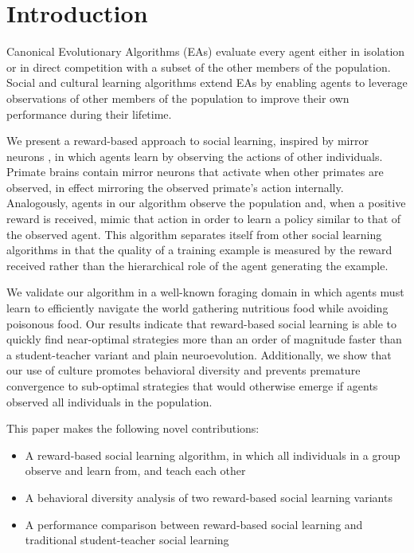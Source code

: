 \documentclass{acm_proc_article-sp}
\begin{document}
\section{Introduction}

Canonical Evolutionary Algorithms (EAs) \cite{fogel1966artificial} evaluate every agent either in isolation or in direct competition with a subset of the other members of the population. Social and cultural learning algorithms \cite{reynolds1994introduction} extend EAs by enabling agents to leverage observations of other members of the population to improve their own performance during their lifetime. 



We present a reward-based approach to social learning, inspired by mirror neurons \cite{gallese-98}, in which agents learn by observing the actions of other individuals. Primate brains contain mirror neurons that activate when other primates are observed, in effect mirroring the observed primate's action internally. Analogously, agents in our algorithm observe the population and, when a positive reward is received, mimic that action in order to learn a policy similar to that of the observed agent. This algorithm separates itself from other social learning algorithms in that the quality of a training example is measured by the reward received rather than the hierarchical role of the agent generating the example.

We validate our algorithm in a well-known foraging domain in which agents must learn to efficiently navigate the world gathering nutritious food while avoiding poisonous food. Our results indicate that reward-based social learning is able to quickly find near-optimal strategies more than an order of magnitude faster than a student-teacher variant and plain neuroevolution. Additionally, we show that our use of culture promotes behavioral diversity and prevents premature convergence to sub-optimal strategies that would otherwise emerge if agents observed all individuals in the population.

This paper makes the following novel contributions:
 
\begin{itemize}
\item A reward-based social learning algorithm, in which all individuals in a group observe and learn from, and teach each other
\item A behavioral diversity analysis of two reward-based social learning variants
\item A performance comparison between reward-based social learning and traditional student-teacher social learning
\end{itemize}
 
\end{document}
